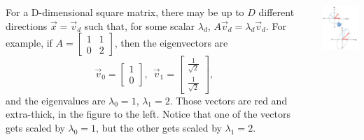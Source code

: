 \documentclass{beamer}
\begin{document}
\begin{frame}
  \begin{columns}[t]
    \column{2.75in}
    \begin{block}{}
      For a D-dimensional square matrix, there may be up to $D$
        different directions $\vec{x}=\vec{v}_d$ such that, for some
        scalar $\lambda_d$, $A\vec{v}_d=\lambda_d\vec{v}_d$.
        For example, if
        $A=\left[\begin{array}{cc}1&1\\0&2\end{array}\right]$, then the
        eigenvectors are
        \[
        \vec{v}_0=\left[\begin{array}{c}1\\0\end{array}\right],~~
        \vec{v}_1=\left[\begin{array}{c}\frac{1}{\sqrt{2}}\\\frac{1}{\sqrt{2}}\end{array}\right],~~
        \]
        and the eigenvalues are $\lambda_0=1$, $\lambda_1=2$.
        Those vectors are red and extra-thick, in the figure to the
        left.  Notice that one of the vectors gets scaled by $\lambda_0=1$, but
        the other gets scaled by $\lambda_1=2$.
    \end{block}
    \column{1.5in}
    \begin{block}{}
      \includegraphics[width=1.45in]{linalg_review_fig2.png}
    \end{block}
  \end{columns}
\end{frame}
\end{document}
